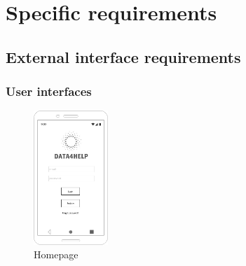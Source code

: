 \section{Specific requirements}
\label{sec:specreq}

  \subsection{External interface requirements}

    \subsubsection{User interfaces}
    \label{sec:userinterfaces}

\begin{figure}[h!]
      \centering

      \includegraphics[width=0.25\textwidth]{img/mockup/homepage.jpg}

  \caption{Homepage}

\end{figure}



